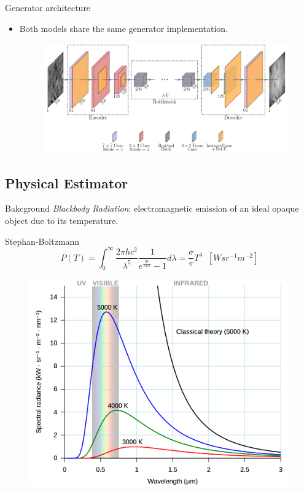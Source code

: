 \begin{frame}{Generator architecture}
  \begin{itemize}
    \item Both models share the same generator implementation.
    \begin{figure}
      \centering
      \includegraphics[width=\linewidth]{../figs/network/src/cut.pdf}
    \end{figure}  
  \end{itemize}
\end{frame}

\subsection{Physical Estimator}

\begin{frame}{Bakcground}
  \emph{Blackbody Radiation}: electromagnetic emission of an ideal opaque object due to its temperature.
  \setlength\abovedisplayskip{0pt}
  \begin{exampleblock}{Stephan-Boltzmann}
    \begin{equation*} \label{eq:stephan-boltzmann-ideal}
      P(T) = \int_0^\infty \frac{2\pi hc^2}{\lambda^5}\frac{1}{e^{\frac{hc}{\lambda kT}} - 1} d\lambda = \frac{\sigma}{\pi} T^4 \; \; \left[W sr^{-1} m^{-2}\right]
    \end{equation*}
  \end{exampleblock}  
  \begin{figure}
    \centering
    \includegraphics[width=0.35\linewidth]{../figs/methods/planck.png}
  \end{figure}
\end{frame}

